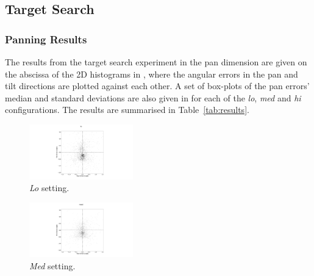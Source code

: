 \documentclass[sigconf, review=true, screen=true, anonymous=true]{acmart}
\begin{document}
\subsection{Target Search}

\subsubsection{Panning Results}

The results from the target search experiment in the pan dimension are given on the abscissa of the 2D histograms in , where the angular errors in the pan and tilt directions are plotted against each other.
A set of box-plots of the pan errors' median and standard deviations are also given in  for each of the \emph{lo}, \emph{med} and \emph{hi} configurations.
The results are summarised in Table~\ref{tab:results}.

\begin{figure}
  \centering
  \includegraphics[clip, trim=450 0 450 110, width=0.4\textwidth]{figures/err_lo.png}
  \caption{\emph{Lo} setting. }
  \label{fig:err-results-lo}
\end{figure}
\begin{figure}
  \centering
  \includegraphics[clip, trim=450 0 450 110, width=0.4\textwidth]{figures/err_med.png}
  \caption{\emph{Med} setting. }
  \label{fig:err-results-med}
\end{figure}
\end{document}
